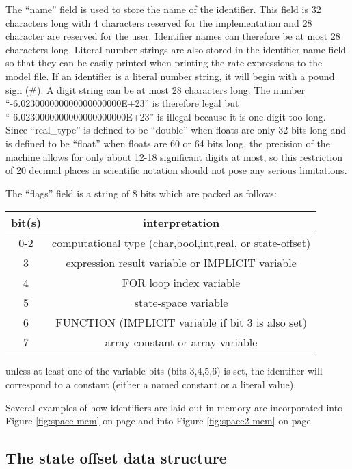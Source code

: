 The ``name'' field is used to store the name of the identifier.   This field
is 32 characters long with 4 characters reserved for the implementation and
28 character are reserved for the user.   Identifier names can therefore
be at most 28 characters long.    Literal number strings are also stored
in the identifier name field so that they can be easily printed when printing
the rate expressions to the model file.   If an identifier is a literal number
string, it will begin with a pound sign (\#).   A digit string can be at most
28 characters long.   The number ``-6.023000000000000000000E+23'' is therefore
legal but ``-6.0230000000000000000000E+23'' is illegal because it is one digit
too long.   Since ``real\_type'' is defined to be ``double'' when floats are
only 32 bits long and is defined to be ``float'' when floats are 60 or 64
bits long, the precision of the machine allows for only about 12-18 significant
digits at most, so this restriction of 20 decimal places in
scientific notation should not pose any serious limitations.

The ``flags'' field is a string of 8 bits which are packed as follows:
\starttab
\begin{tabular}{|c|c|}
\hline
bit(s) & interpretation \\
\hline
\hline
0-2    & computational type (char,bool,int,real, or state-offset) \\
3      & expression result variable or IMPLICIT variable \\
4      & FOR loop index variable \\
5      & state-space variable \\
6      & FUNCTION (IMPLICIT variable if bit 3 is also set) \\
7      & array constant or array variable \\
\hline
\end{tabular}

unless at least one of the variable bits (bits 3,4,5,6) is set,
the identifier will correspond
to a constant (either a named constant or a literal value).

Several examples of how identifiers are laid out in memory are
incorporated into Figure \ref{fig:space-mem} on page \pageref{fig:space-mem}
and into Figure \ref{fig:space2-mem} on page \pageref{fig:space2-mem}

\subsection{The state offset data structure}
\label{sec:soff}

